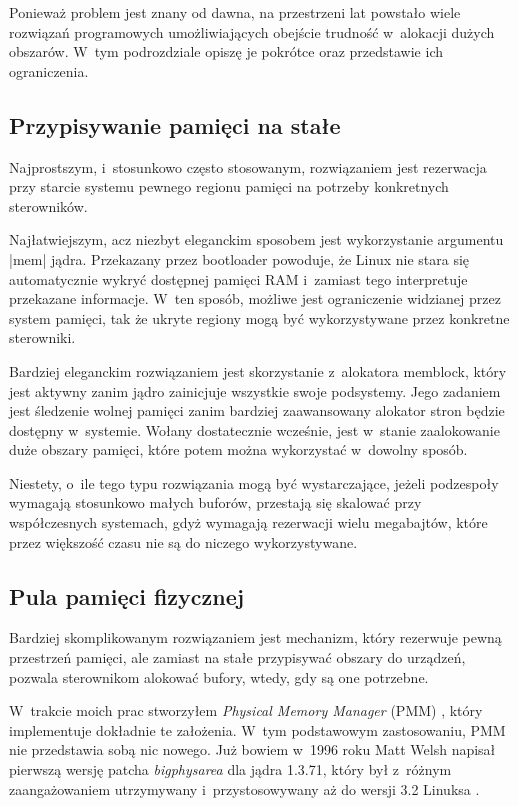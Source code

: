 Ponieważ problem jest znany od dawna, na przestrzeni lat powstało
wiele rozwiązań programowych umożliwiających obejście trudność
w~alokacji dużych obszarów.  W~tym podrozdziale opiszę je pokrótce
oraz przedstawie ich ograniczenia.

\subsection{Przypisywanie pamięci na stałe}

Najprostszym, i~stosunkowo często stosowanym, rozwiązaniem jest
rezerwacja przy starcie systemu pewnego regionu pamięci na potrzeby
konkretnych sterowników.

Najłatwiejszym, acz niezbyt eleganckim sposobem jest wykorzystanie
argumentu \code|mem| jądra.  Przekazany przez bootloader powoduje, że
Linux nie stara się automatycznie wykryć dostępnej pamięci RAM
i~zamiast tego interpretuje przekazane informacje.  W~ten sposób,
możliwe jest ograniczenie widzianej przez system pamięci, tak że
ukryte regiony mogą być wykorzystywane przez konkretne sterowniki.

Bardziej eleganckim rozwiązaniem jest skorzystanie z~alokatora
memblock, który jest aktywny zanim jądro zainicjuje wszystkie swoje
podsystemy.  Jego zadaniem jest śledzenie wolnej pamięci zanim
bardziej zaawansowany alokator stron będzie dostępny w~systemie.
Wołany dostatecznie wcześnie, jest w~stanie zaalokowanie duże obszary
pamięci, które potem można wykorzystać w~dowolny sposób.

Niestety, o~ile tego typu rozwiązania mogą być wystarczające, jeżeli
podzespoły wymagają stosunkowo małych buforów, przestają się skalować
przy współczesnych systemach, gdyż wymagają rezerwacji wielu
megabajtów, które przez większość czasu nie są do niczego
wykorzystywane.

\subsection{Pula pamięci fizycznej}

Bardziej skomplikowanym rozwiązaniem jest mechanizm, który rezerwuje
pewną przestrzeń pamięci, ale zamiast na stałe przypisywać obszary do
urządzeń, pozwala sterownikom alokować bufory, wtedy, gdy są one
potrzebne.

W~trakcie moich prac stworzyłem {\it Physical Memory Manager} (PMM)
\autocite{patch:pmm}, który implementuje dokładnie te założenia. W~tym
podstawowym zastosowaniu, PMM nie przedstawia sobą nic nowego.  Już
bowiem w~1996 roku Matt Welsh napisał pierwszą wersję patcha
\emph{bigphysarea} dla jądra 1.3.71, który był z~różnym zaangażowaniem
utrzymywany i~przystosowywany aż do wersji 3.2 Linuksa
\autocite{patch:bigphys}.

